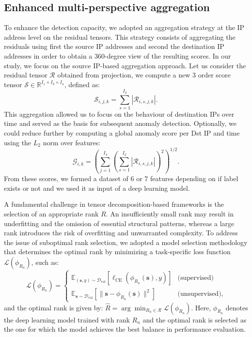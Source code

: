 \documentclass[pdflatex,sn-mathphys-num]{sn-jnl}
\theoremstyle{thmstyleone}
\theoremstyle{thmstyletwo}
\theoremstyle{thmstylethree}
\begin{document}
\subsection{Enhanced multi-perspective aggregation}

To enhance the detection capacity, we adopted an aggregation strategy at the IP address level on the residual tensors. This strategy consists of aggregating the residuals using first the source IP addresses and second the destination IP addresses in order to obtain a 360-degree view of the resulting scores. In our study, we focus on the source IP-based aggregation approach. Let us consider the residual tensor \(\mathcal{R}\) obtained from projection, we compute a new 3 order score tensor \(\mathcal{S} \in \mathbb{R}^{I_1 \times I_3 \times I_4}\), defined as:
\begin{equation}
    \mathcal{S}_{i, j, k} = \sum_{s=1}^{I_2} |\mathcal{R}_{i, s, j, k}|.
\end{equation}
\noindent This aggregation allowed us to focus on the behaviour of destination IPs over time and served as the basis for subsequent anomaly detection. Optionally, we could reduce further by computing a global anomaly score per Dst IP and time using the \(L_2\) norm over features:
\[
\mathcal{G}_{i,k} = \left( \sum_{j=1}^{I_3} \left( \sum_{s=1}^{I_2} |\mathcal{R}_{i, s, j, k}| \right)^2 \right)^{1/2}.
\]
\noindent From these scores, we formed a dataset of 6 or 7 features depending on if label exists or not and we used it as input of a deep learning model.

A fundamental challenge in tensor decomposition-based frameworks is the selection of an appropriate rank \(R\). An insufficiently small rank may result in underfitting and the omission of essential structural patterns, whereas a large rank introduces the risk of overfitting and unwarranted complexity. To address the issue of suboptimal rank selection, we adopted a model selection methodology that determines the optimal rank by minimizing a task-specific loss function \( \mathcal{L}(\phi_{R_n}) \), such as:
\[
    \mathcal{L}(\phi_{R_n}) = 
    \begin{cases}
        \mathbb{E}_{(\mathbf{s}, y) \sim \mathcal{D}_{\text{val}}} \left[ \ell_{\text{CE}}\left(\phi_{R_n}(\mathbf{s}), y \right) \right] & \text{(supervised)} \\
        \mathbb{E}_{\mathbf{s} \sim \mathcal{D}_{\text{val}}} \left[ \|\mathbf{s} - \phi_{R_n}(\mathbf{s})\|^2 \right] & \text{(unsupervised)},
    \end{cases}
\]
and the optimal rank is given by: 
\(
    \hat{R} = \arg\min_{R_n \in \mathcal{R}} \mathcal{L}(\phi_{R_n}). 
\)  Here, \(\phi_{R_n}\) 
denotes the deep learning model trained with rank \(R_n\)
and the optimal rank is selected as the one for which the model achieves the best balance in performance evaluation.   
\end{document}
